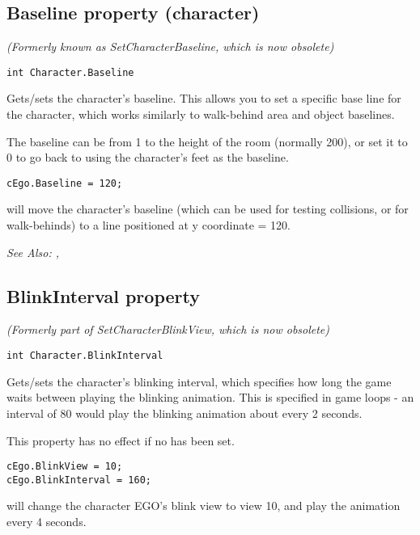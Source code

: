 \subsection{Baseline property (character)}\label{Character.Baseline}%

\it{(Formerly known as SetCharacterBaseline, which is now obsolete)}

\begin{verbatim}
int Character.Baseline
\end{verbatim}
Gets/sets the character's baseline. This allows you to set a specific
base line for the character, which works similarly to walk-behind area and
object baselines.

The baseline can be from 1 to the height of the room (normally 200), or set it
to 0 to go back to using the character's feet as the baseline.

\begin{verbatim}
cEgo.Baseline = 120;
\end{verbatim}
will move the character's baseline (which can be used for testing collisions,
or for walk-behinds) to a line positioned at y coordinate = 120.

\it{See Also:} , 



\subsection{BlinkInterval property}\label{Character.BlinkInterval}%

\it{(Formerly part of SetCharacterBlinkView, which is now obsolete)}

\begin{verbatim}
int Character.BlinkInterval
\end{verbatim}
Gets/sets the character's blinking interval, which specifies how long the game waits
between playing the blinking animation. This is specified in game loops - an interval
of 80 would play the blinking animation about every 2 seconds.

This property has no effect if no  has been set.

\begin{verbatim}
cEgo.BlinkView = 10;
cEgo.BlinkInterval = 160;
\end{verbatim}
will change the character EGO's blink view to view 10, and play the animation every 4 seconds.

